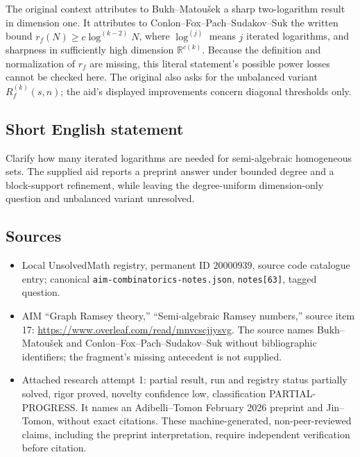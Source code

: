 \documentclass[11pt]{article}
\newcommand{\R}{\mathbb{R}}
\begin{document}
The original context attributes to Bukh--Matou\v{s}ek a sharp two-logarithm result in dimension one. It attributes to Conlon--Fox--Pach--Sudakov--Suk the written bound $r_f(N)\ge c\log^{(k-2)}N$, where $\log^{(j)}$ means $j$ iterated logarithms, and sharpness in sufficiently high dimension $\R^{c(k)}$. Because the definition and normalization of $r_f$ are missing, this literal statement's possible power losses cannot be checked here. The original also asks for the unbalanced variant $R_f^{(k)}(s,n)$; the aid's displayed improvements concern diagonal thresholds only.
\subsection{Short English statement}
Clarify how many iterated logarithms are needed for semi-algebraic homogeneous sets. The supplied aid reports a preprint answer under bounded degree and a block-support refinement, while leaving the degree-uniform dimension-only question and unbalanced variant unresolved.
\subsection{Sources}
\begin{itemize}
\item Local UnsolvedMath registry, permanent ID $20000939$, source code catalogue entry; canonical \texttt{aim-combinatorics-notes.json}, \texttt{notes[63]}, tagged question.
\item AIM ``Graph Ramsey theory,'' ``Semi-algebraic Ramsey numbers,'' source item 17: \url{https://www.overleaf.com/read/mnvcscjjysvg}. The source names Bukh--Matou\v{s}ek and Conlon--Fox--Pach--Sudakov--Suk without bibliographic identifiers; the fragment's missing antecedent is not supplied.
\item Attached research attempt 1: partial result, run and registry status partially solved, rigor proved, novelty confidence low, classification PARTIAL-PROGRESS. It names an Adibelli--Tomon February 2026 preprint and Jin--Tomon, without exact citations. These machine-generated, non-peer-reviewed claims, including the preprint interpretation, require independent verification before citation.
\end{itemize}
\end{document}
